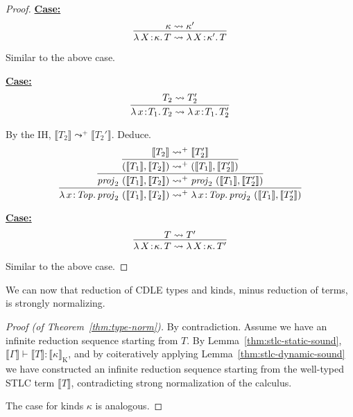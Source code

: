 \documentclass{article}
\newcommand{\abs}[4]{{#1}\, #2\! : \! #3.\, #4}
\newcommand{\interp}[1]{\llbracket #1 \rrbracket}
\newcommand{\startcase}[1]{\vspace{#1} \noindent\textbf{\underline{Case:}}}
\begin{document}
\begin{proof}
  \startcase{.2cm}
  \[
    \infer{
      \abs{\lambda}{X}{\kappa}{T}
      \leadsto
      \abs{\lambda}{X}{\kappa'}{T}
    }{
      \kappa \leadsto \kappa'
    }
  \]

  Similar to the above case.

  \startcase{.2cm}
  \[
    \infer{
      \abs{\lambda}{x}{T_1}{T_2} \leadsto \abs{\lambda}{x}{T_1}{T_2'}
    }{
      T_2 \leadsto T_2'
    }
  \]

  By the IH, \(\interp{T_2} \leadsto^+ \interp{T_2'}\).
  Deduce.
  \[
    \infer{
      \abs{\lambda}{x}{\mathit{Top}}{\mathit{proj}_2\ (\interp{T_1},\interp{T_2})}
      \leadsto^+
      \abs{\lambda}{x}{\mathit{Top}}{\mathit{proj}_2\ (\interp{T_1},\interp{T_2'})}
    }{
      \infer{
        \mathit{proj}_2\ (\interp{T_1},\interp{T_2})
        \leadsto^+
        \mathit{proj}_2\ (\interp{T_1},\interp{T_2'})
      }{
        \infer{
          (\interp{T_1},\interp{T_2})
          \leadsto^+
          (\interp{T_1},\interp{T_2'})
        }{
          \interp{T_2} \leadsto^+ \interp{T_2'}
        }
      }
    }
  \]

  \startcase{.2cm}
  \[
    \infer{
      \abs{\lambda}{X}{\kappa}{T} \leadsto \abs{\lambda}{X}{\kappa}{T'}
    }{
      T \leadsto T'
    }
  \]

  Similar to the above case.
\end{proof}

We can now that reduction of CDLE types and kinds, minus reduction of terms, is
strongly normalizing.
\begin{proof}[Proof (of Theorem~\ref{thm:type-norm})]
  By contradiction. Assume we have an infinite reduction sequence starting from
  \(T\).
  By Lemma~\ref{thm:stlc-static-sound}, \(\interp{\Gamma} \vdash \interp{T} :
  \interp{\kappa}_{\text{K}}\), and by coiteratively applying
  Lemma~\ref{thm:stlc-dynamic-sound} we have constructed an infinite reduction
  sequence starting from the well-typed STLC term \(\interp{T}\), contradicting
  strong normalization of the calculus.

  The case for kinds \(\kappa\) is analogous.
\end{proof}
\end{document}
